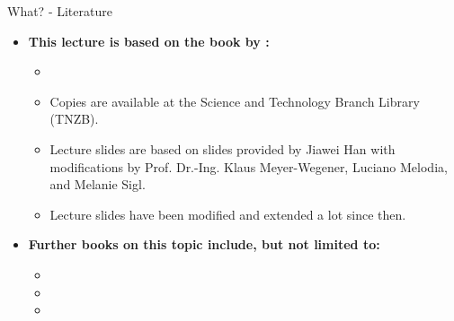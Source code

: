 \begin{frame}{What? - Literature}
	\begin{itemize}
		\item \textbf{This lecture is based on the book by \citeauthor{han2011}:}
		      \begin{itemize}
			      \item {}
			      \item {\color{faugray}Copies are available at the Science and Technology Branch Library (TNZB).}
			      \item Lecture slides are based on slides provided by Jiawei Han with modifications by Prof. Dr.-Ing. Klaus Meyer-Wegener, Luciano Melodia, and Melanie Sigl.
			      \item Lecture slides have been modified and extended a lot since then.
		      \end{itemize}
		\item \textbf{Further books on this topic include, but not limited to:}
		      \begin{itemize}
			      \item {}
			      \item {}
			      \item {}
		      \end{itemize}
	\end{itemize}
\end{frame}
